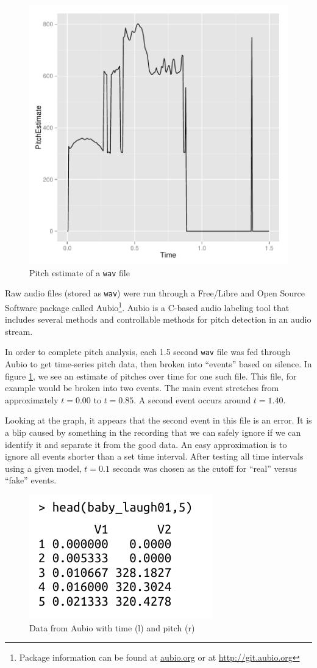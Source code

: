 \documentclass[paper=a4, fontsize=11pt]{scrartcl}
\numberwithin{equation}{section}
\numberwithin{figure}{section}
\numberwithin{table}{section}
\begin{document}
\begin{figure}
\begin{center}
\vspace{-20pt}
\includegraphics[width=.38\textwidth]{pitch_time.pdf}
\caption{Pitch estimate of a \texttt{wav} file}\label{fig:aubiograph}
\vspace{-20pt}
\end{center}
\end{figure}

Raw audio files (stored as \texttt{wav}) were run through a Free/Libre and Open Source Software package called Aubio\footnote{Package information can be found at \url{aubio.org} or at \url{http://git.aubio.org}}. Aubio is a C-based audio labeling tool that includes several methods and controllable methods for pitch detection in an audio stream.

In order to complete pitch analysis, each 1.5 second \texttt{wav} file was fed through Aubio to get time-series pitch data, then broken into ``events'' based on silence. In figure \ref{fig:aubiograph}, we see an estimate of pitches over time for one such file. This file, for example would be broken into two events. The main event stretches from approximately $t=0.00$ to $t=0.85$. A second event occurs around $t=1.40$.

Looking at the graph, it appears that the second event in this file is an error. It is a blip caused by something in the recording that we can safely ignore if we can identify it and separate it from the good data. An easy approximation is to ignore all events shorter than a set time interval. After testing all time intervals using a given model, $t=0.1$ seconds was chosen as the cutoff for ``real'' versus ``fake'' events.

\begin{figure}
\begin{center}
\vspace{-15pt}
\includegraphics[width=.28\textwidth]{aubio_out.pdf}
\caption{Data from Aubio with time (l) and pitch (r)}\label{fig:headaubio}
\end{center}
\vspace{-20pt}
\end{figure}
\end{document}
